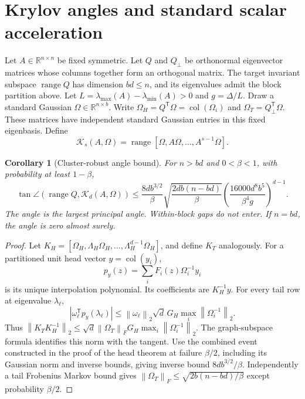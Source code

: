 \documentclass[11pt]{article}
\newtheorem{corollary}[theorem]{Corollary}
\newcommand{\R}{\mathbb R}
\newcommand{\norm}[1]{\left\lVert#1\right\rVert}
\newcommand{\K}{\mathcal K}
\newcommand{\range}{\operatorname{range}}
\begin{document}
\section{Krylov angles and standard scalar acceleration}
Let $A\in\R^{n\times n}$ be fixed symmetric. Let $Q$ and $Q_\perp$ be
orthonormal eigenvector matrices whose columns together form an orthogonal
matrix. The target invariant subspace $\range Q$ has dimension $bd\leq n$,
and its eigenvalues admit the block partition
above. Let $L=\lambda_{\max}(A)-\lambda_{\min}(A)>0$ and
$g=\Delta/L$. Draw a standard Gaussian $\Omega\in\R^{n\times b}$.
Write $\Omega_H=Q^{\mathsf T}\Omega=\operatorname{col}(\Omega_i)$ and
$\Omega_T=Q_\perp^{\mathsf T}\Omega$. These matrices have independent
standard Gaussian entries in this fixed eigenbasis. Define
\[
 \K_s(A,\Omega)=\range[\Omega,A\Omega,\ldots,A^{s-1}\Omega].
\]

\begin{corollary}[Cluster-robust angle bound]\label{cor:angle}
For $n>bd$ and $0<\beta<1$, with probability at least $1-\beta$,
\[
 \tan\angle(\range Q,\K_d(A,\Omega))
 \leq\frac{8db^{3/2}}\beta
       \sqrt{\frac{2db(n-bd)}\beta}
       \left(\frac{16000d^8b^5}{\beta^4g}\right)^{d-1}.
\]
The angle is the largest principal angle. Within-block gaps do not enter.
If $n=bd$, the angle is zero almost surely.
\end{corollary}
\begin{proof}
Let $K_H=[\Omega_H,\Lambda_H\Omega_H,\ldots,
\Lambda_H^{d-1}\Omega_H]$, and define $K_T$ analogously.
For a partitioned unit head vector $y=\operatorname{col}(y_i)$,
\[
 p_y(z)=\sum_iF_i(z)\Omega_i^{-1}y_i
\]
is its unique interpolation polynomial. Its coefficients are $K_H^{-1}y$.
For every tail row at eigenvalue $\lambda_\ell$,
\[
 |\omega_\ell^{\mathsf T}p_y(\lambda_\ell)|
 \leq\norm{\omega_\ell}_2\sqrt d\,G_H
                     \max_i\norm{\Omega_i^{-1}}_2.
\]
Thus $\norm{K_TK_H^{-1}}_2\leq
\sqrt d\norm{\Omega_T}_F G_H\max_i\norm{\Omega_i^{-1}}_2$.
The graph-subspace formula identifies this norm with the tangent.
Use the combined event constructed in the proof of the head theorem
at failure $\beta/2$, including its Gaussian norm and inverse bounds,
giving inverse bound $8db^{3/2}/\beta$. Independently a tail Frobenius
Markov bound gives $\norm{\Omega_T}_F\leq
\sqrt{2b(n-bd)/\beta}$ except probability $\beta/2$.
\end{proof}
\end{document}
